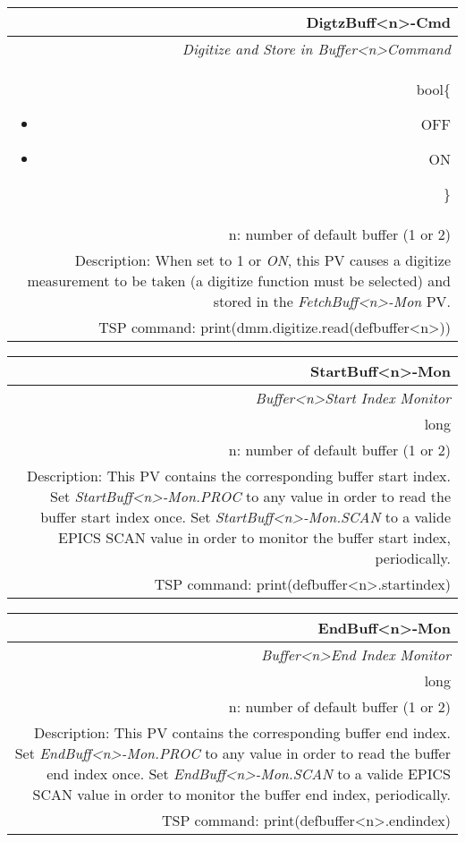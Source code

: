 \documentclass[openany]{article}
\begin{document}
		\begin{tabular}{N}
			\hline
			\bfseries DigtzBuff\textless n\textgreater-Cmd\label{pv:digtzbuff-cmd} \\ \hline
			\emph{Digitize and Store in Buffer\textless n\textgreater Command} \\
			bool\{\begin{itemize}[noitemsep]
				\small
				\item[] OFF
				\item[] ON
			\end{itemize}\} \\
			n: number of default buffer (1 or 2) \\
			Description: When set to 1 or \emph{ON}, this PV causes a digitize measurement to be taken (a digitize function must be selected) and stored in the \emph{FetchBuff\textless n\textgreater-Mon} PV. \\
			TSP command: print(dmm.digitize.read(defbuffer\textless n\textgreater))
		\end{tabular}

		\begin{tabular}{N}
			\hline
			\bfseries StartBuff\textless n\textgreater-Mon\label{pv:startbuff-mon} \\ \hline
			\emph{Buffer\textless n\textgreater Start Index Monitor} \\
			long \\
			n: number of default buffer (1 or 2) \\
			Description: This PV contains the corresponding buffer start index. Set \emph{StartBuff\textless n\textgreater-Mon.PROC} to any value in order to read the buffer start index once. Set \emph{StartBuff\textless n\textgreater-Mon.SCAN} to a valide EPICS SCAN value in order to monitor the buffer start index, periodically. \\
			TSP command: print(defbuffer\textless n\textgreater.startindex)
		\end{tabular}

		\begin{tabular}{N}
			\hline
			\bfseries EndBuff\textless n\textgreater-Mon\label{pv:endbuff-mon} \\ \hline
			\emph{Buffer\textless n\textgreater End Index Monitor} \\
			long \\
			n: number of default buffer (1 or 2) \\
			Description: This PV contains the corresponding buffer end index. Set \emph{EndBuff\textless n\textgreater-Mon.PROC} to any value in order to read the buffer end index once. Set \emph{EndBuff\textless n\textgreater-Mon.SCAN} to a valide EPICS SCAN value in order to monitor the buffer end index, periodically. \\
			TSP command: print(defbuffer\textless n\textgreater.endindex)
		\end{tabular}
\end{document}
